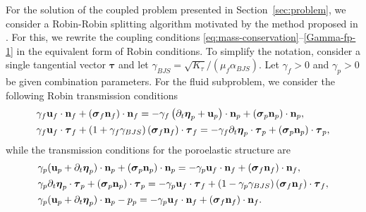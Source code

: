 \documentclass[11pt]{article}
\def\u{{\bf u}}
\def\n{{\bf n}}
\def\btau{\boldsymbol{\tau}}
\def\bbeta{\boldsymbol{\eta}}
\def\bs{\boldsymbol{\sigma}}
\def\d{\partial}
\begin{document}
For the solution of the coupled problem presented in Section~\ref{sec:problem}, {we consider
a Robin-Robin splitting algorithm motivated by the method proposed in \cite{bqq2009}}. For this, we rewrite the coupling conditions \eqref{eq:mass-conservation}--\eqref{Gamma-fp-1} in the equivalent form of Robin conditions. To simplify the notation, consider a single
tangential vector $\btau$ and let $\gamma_{BJS} = \sqrt{K_{\tau}}/(\mu_{f} \alpha_{BJS})$. {Let $\gamma_f > 0$ and $\gamma_p > 0$ be given combination parameters.} For the fluid subproblem, we consider the following Robin transmission conditions
%
\begin{subequations}\label{stokes-robin}
\begin{align}
  & \gamma_f\u_f\cdot\n_f + (\bs_f \n_f)\cdot\n_f =
  -\gamma_f \left(\d_t \bbeta_p + \u_p\right)\cdot\n_p + (\bs_p \n_p)\cdot\n_p,
  \label{stokes-robin-1} \\
  &\gamma_f\u_f\cdot\btau_{f}
  + \left(1 + \gamma_f\gamma_{BJS}  \right)(\bs_f\n_f)\cdot\btau_{f}
  = - \gamma_f \d_t \bbeta_p\cdot\btau_{p} + (\bs_p\n_p)\cdot\btau_{p},
  \label{stokes-robin-2}
\end{align}
\end{subequations}
%
while the transmission conditions for the poroelastic structure are
%
\begin{subequations}\label{biot-robin}
\begin{align}
& \gamma_p(\u_p + \d_t\bbeta_p)\cdot\n_p + (\bs_p \n_p)\cdot\n_p =
- \gamma_p \u_f\cdot\n_f + (\bs_f \n_f)\cdot\n_f, \label{biot-robin-1}\\
& \gamma_p \d_t \bbeta_p\cdot\btau_{p} + (\bs_p\n_p)\cdot\btau_{p} =
- \gamma_p \u_f\cdot\btau_{f}
+ \left(1 -\gamma_p \gamma_{BJS} \right)
(\bs_f\n_f)\cdot\btau_{f}, \label{biot-robin-2}\\
& \gamma_p (\u_p + \d_t\bbeta_p)\cdot\n_p - p_p =
-\gamma_p \u_f\cdot\n_f + (\bs_f \n_f)\cdot\n_f. \label{biot-robin-3}
\end{align}
\end{subequations}
%
\end{document}
